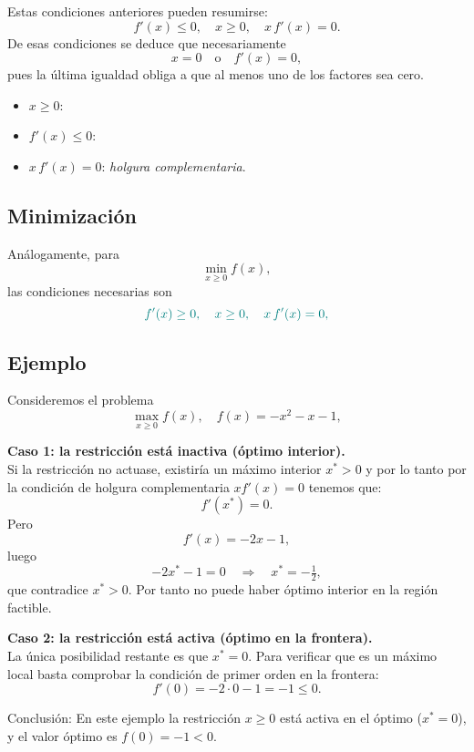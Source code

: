 \documentclass{article}
\begin{document}
Estas condiciones anteriores pueden resumirse:
\[
f'(x)\le0,\quad x\ge0,\quad x\,f'(x)=0.
\]
De esas condiciones se deduce que necesariamente
\[
x=0\quad\text{o}\quad f'(x)=0,
\]
pues la última igualdad obliga a que al menos uno de los factores sea cero.

\begin{itemize}\color{teal}
  \item \(x\ge0\): 
  \item \(f'(x)\le0\): 
  \item \(x\,f'(x)=0\): \emph{holgura complementaria}.
\end{itemize}


\subsection*{Minimización}


Análogamente, para
\[
\min_{x\ge0}f(x),
\]
las condiciones necesarias son
\[\color{teal}
f'(x)\ge0,\quad x\ge0,\quad x\,f'(x)=0,
\]

\subsection*{Ejemplo}

Consideremos el problema
\[
\max_{x\ge0}f(x),
\quad
f(x) = -x^2 - x - 1,
\]


\textbf{Caso 1: la restricción está inactiva (óptimo interior).}\\
Si la restricción no actuase, existiría un máximo interior \(x^*>0\) y por lo tanto por la condición de holgura complementaria $x f'(x)=0$ tenemos que:
\[
f'(x^*) = 0.
\]
Pero
\[
f'(x) = -2x - 1,
\]
luego
\[
-2x^* - 1 = 0
\quad\Longrightarrow\quad
x^* = -\tfrac12,
\]
que contradice \(x^*>0\). Por tanto no puede haber óptimo interior en la región factible.

\medskip

\textbf{Caso 2: la restricción está activa (óptimo en la frontera).}\\
La única posibilidad restante es que \(x^*=0\). Para verificar que es un máximo local basta comprobar la condición de primer orden en la frontera:
\[
f'(0) = -2\cdot 0 - 1 = -1 \le 0.
\]

{\color{teal}Conclusión: En este ejemplo la restricción \(x\ge0\) está activa en el óptimo (\(x^*=0\)), y el valor óptimo es \(f(0)=-1<0\).}
\end{document}
